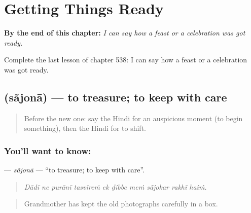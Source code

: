
\chapter{Getting Things Ready}
\label{ch:hi-getting-things-ready}

\begin{chapteropening}
\textbf{By the end of this chapter:} \emph{I can say how a feast or a celebration was got ready.}

Complete the last lesson of chapter 538: I can say how a feast or a celebration was got ready.
\end{chapteropening}

\section[\texorpdfstring{\hi{सँजोना} (sãjonā)}{सँजोना (sãjonā)}]{ (sãjonā) — to treasure; to keep with care}

\label{lesson:HI-C538-sajona}



\begin{quote}
Before the new one: say the Hindi for an auspicious moment (to begin something), then the Hindi for to shift.
\end{quote}

\subsection*{You'll want to know: }
\textbf{} — \emph{sãjonā} — \textquotedblleft{}to treasure; to keep with care\textquotedblright{}.

\begin{quote}
         
\end{quote}

\begin{quote}
\emph{Dādī ne purānī tasvīreṁ ek ḍibbe meṁ sãjokar rakhī haiṁ.}
\end{quote}

\begin{quote}
Grandmother has kept the old photographs carefully in a box.
\end{quote}

